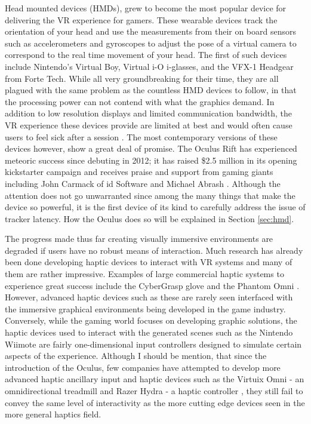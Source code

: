 Head mounted devices (HMDs), grew to become the most popular device for
delivering the VR experience for gamers.  These wearable devices track the
orientation of your head and use the measurements from their on board sensors
such as accelerometers and gyroscopes to adjust the pose of a virtual camera to
correspond to the real time movement of your head.  The first of such devices
include Nintendo's Virtual Boy, Virtual i-O i-glasses, and the VFX-1 Headgear
from Forte Tech. While all very groundbreaking for their time, they are all
plagued with the same problem as the countless HMD devices to follow, in that
the processing power can not contend with what the graphics demand.  In
addition to low resolution displays and limited communication bandwidth, the VR
experience these devices provide are limited at best and would often cause
users to feel sick after a session \cite{zachara2009challenges}. The most
contemporary versions of these devices however, show a great deal of promise.
The Oculus Rift \cite{website:oculusvr} has experienced meteoric success since
debuting in 2012; it has raised \$2.5 million in its opening kickstarter
campaign and receives praise and support from gaming giants including John
Carmack of id Software and Michael Abrash \cite{website:kickstarterovr}.
Although the attention does not go unwarranted since among the many things that
make the device so powerful, it is the first device of its kind to carefully
address the issue of tracker latency. How the Oculus does so will be explained
in Section \ref{sec:hmd}.

The progress made thus far creating visually immersive environments are
degraded if users have no robust means of interaction. Much research has
already been done developing haptic devices to interact with VR systems and
many of them are rather impressive. Examples of large commercial haptic systems
to experience great success include the CyberGrasp glove
\cite{website:cybergrasp} and the Phantom Omni \cite{website:geomagic}.
However, advanced haptic devices such as these are rarely seen interfaced with
the immersive graphical environments being developed in the game industry.
Conversely, while the gaming world focuses on developing graphic solutions, the
haptic devices used to interact with the generated scenes such as the Nintendo
Wiimote \cite{website:wiimote} are fairly one-dimensional input controllers
designed to simulate certain aspects of the experience. Although I should be
mention, that since the introduction of the Oculus, few companies have
attempted to develop more advanced haptic ancillary input and haptic devices
such as the Virtuix Omni - an omnidirectional treadmill and Razer Hydra - a
haptic controller \cite{website:razer}, they still fail to convey the same
level of interactivity as the more cutting edge devices seen in the more
general haptics field.

